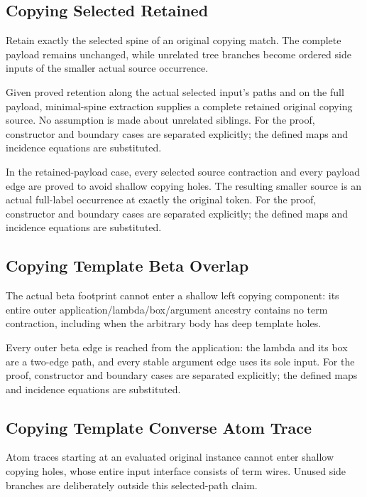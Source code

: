 \subsection{Copying Selected Retained}
Retain exactly the selected spine of an original copying match. The complete payload remains unchanged, while unrelated tree branches become ordered side inputs of the smaller actual source occurrence.

Given proved retention along the actual selected input's paths and on the full payload, minimal-spine extraction supplies a complete retained original copying source. No assumption is made about unrelated siblings.
For the proof, constructor and boundary cases are separated explicitly; the defined maps and incidence equations are substituted.
\par{}

In the retained-payload case, every selected source contraction and every payload edge are proved to avoid shallow copying holes. The resulting smaller source is an actual full-label occurrence at exactly the original token.
For the proof, constructor and boundary cases are separated explicitly; the defined maps and incidence equations are substituted.
\par{}

\subsection{Copying Template Beta Overlap}
The actual beta footprint cannot enter a shallow left copying component: its entire outer application/lambda/box/argument ancestry contains no term contraction, including when the arbitrary body has deep template holes.

Every outer beta edge is reached from the application: the lambda and its box are a two-edge path, and every stable argument edge uses its sole input.
For the proof, constructor and boundary cases are separated explicitly; the defined maps and incidence equations are substituted.
\par{}

\subsection{Copying Template Converse Atom Trace}
Atom traces starting at an evaluated original instance cannot enter shallow copying holes, whose entire input interface consists of term wires. Unused side branches are deliberately outside this selected-path claim.

